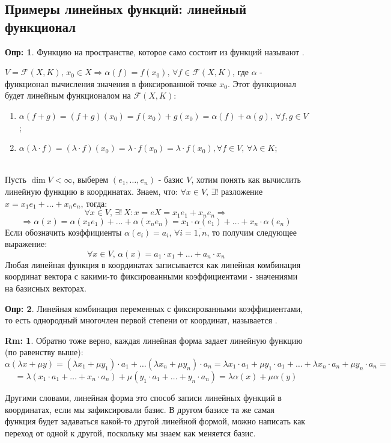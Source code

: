 \documentclass[12pt]{article}
\newcommand{\MF}{\mathcal{F}}
\theoremstyle{definition}
\newtheorem{defn}{Опр:}
\newtheorem{rem}{Rm:}
\begin{document}
\subsection*{Примеры линейных функций: линейный функционал}
\begin{defn}
	Функцию на пространстве, которое само состоит из функций называют .
\end{defn}
$V = \MF(X,K), \, x_0 \in X \Rightarrow \alpha(f) = f(x_0), \, \forall f \in \MF(X,K)$, где $\alpha$ - функционал вычисления значения в фиксированной точке $x_0$. Этот функционал будет линейным функционалом на $\MF(X,K)$:
\begin{enumerate}[label=(\arabic*)]
	\item $\alpha(f + g) = (f+g)(x_0) = f(x_0) + g(x_0) = \alpha(f) + \alpha(g), \, \forall f,g \in V$;
	\item $\alpha(\lambda{\cdot}f) = (\lambda{\cdot}f)(x_0)= \lambda{\cdot}f(x_0) = \lambda{\cdot}f(x_0), \forall f \in V, \, \forall \lambda \in K$;
\end{enumerate}
\hfill\\
Пусть $\dim{V} < \infty$, выберем $(e_1,\dotsc, e_n)$ - базис $V$, хотим понять как вычислить линейную функцию в координатах. Знаем, что: $\forall x \in V, \, \exists!$ разложение $x = x_1 e_1 + \dotsc + x_n e_n$, тогда:
$$
	\forall x \in V, \, \exists! \, X \colon x = eX = x_1 e_1 + x_n e_n \Rightarrow
$$
$$
	\Rightarrow \alpha(x) = \alpha(x_1 e_1) + \dotsc + \alpha(x_n e_n) = x_1{\cdot}\alpha(e_1) + \dotsc + x_n{\cdot}\alpha(e_n)
$$
Если обозначить коэффициенты $\alpha(e_i) = a_i, \, \forall i = \overline{1,n}$, то получим следующее выражение:
$$
	\forall x \in V, \, \alpha(x) = a_1{\cdot}x_1 + \dotsc + a_n{\cdot}x_n
$$
Любая линейная функция в координатах записывается как линейная комбинация координат вектора с какими-то фиксированными коэффициентами - значениями на базисных векторах.
\begin{defn}
	Линейная комбинация переменных с фиксированными коэффициентами, то есть однородный многочлен первой степени от координат, называется .
\end{defn}
\begin{rem}
	Обратно тоже верно, каждая линейная форма задает линейную функцию (по равенству выше):
	$$
		\alpha(\lambda x + \mu y) = (\lambda x_1 + \mu y_1){\cdot}a_1 + \dotsc (\lambda x_n + \mu y_n){\cdot}a_n = \lambda x_1 {\cdot}a_1 + \mu y_1{\cdot}a_1 + \dotsc + \lambda x_n {\cdot}a_n + \mu y_n{\cdot}a_n = 
	$$
	$$	
		= \lambda(x_1 {\cdot}a_1 + \dotsc + x_n{\cdot} a_n) + \mu(y_1{\cdot} a_1 + \dotsc + y_n {\cdot}a_n) = \lambda\alpha(x) + \mu\alpha(y)
	$$
\end{rem}
Другими словами, линейная форма это способ записи линейных функций в координатах, если мы зафиксировали базис. В другом базисе та же самая функция будет задаваться какой-то другой линейной формой, можно написать как переход от одной к другой, поскольку мы знаем как меняется базис.
\end{document}
